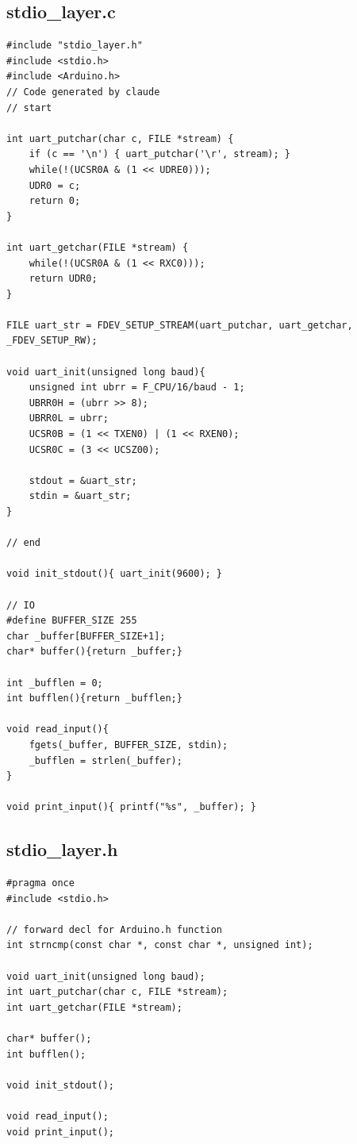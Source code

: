 \documentclass[12pt,a4paper]{article}
\begin{document}
\subsection{stdio\_layer.c}
\begin{lstlisting}
#include "stdio_layer.h"
#include <stdio.h>
#include <Arduino.h>
// Code generated by claude
// start

int uart_putchar(char c, FILE *stream) {
	if (c == '\n') { uart_putchar('\r', stream); }
	while(!(UCSR0A & (1 << UDRE0)));
	UDR0 = c;
	return 0;
}

int uart_getchar(FILE *stream) {
	while(!(UCSR0A & (1 << RXC0)));
	return UDR0;
}

FILE uart_str = FDEV_SETUP_STREAM(uart_putchar, uart_getchar, _FDEV_SETUP_RW);

void uart_init(unsigned long baud){
	unsigned int ubrr = F_CPU/16/baud - 1;
	UBRR0H = (ubrr >> 8);
	UBRR0L = ubrr;
	UCSR0B = (1 << TXEN0) | (1 << RXEN0);
	UCSR0C = (3 << UCSZ00);

	stdout = &uart_str;
	stdin = &uart_str;
}

// end

void init_stdout(){ uart_init(9600); }

// IO
#define BUFFER_SIZE 255
char _buffer[BUFFER_SIZE+1];
char* buffer(){return _buffer;}

int _bufflen = 0;
int bufflen(){return _bufflen;}

void read_input(){
	fgets(_buffer, BUFFER_SIZE, stdin);
	_bufflen = strlen(_buffer);
}

void print_input(){ printf("%s", _buffer); }
\end{lstlisting}

\subsection{stdio\_layer.h}
\begin{lstlisting}
#pragma once
#include <stdio.h>

// forward decl for Arduino.h function
int strncmp(const char *, const char *, unsigned int);

void uart_init(unsigned long baud);
int uart_putchar(char c, FILE *stream);
int uart_getchar(FILE *stream);

char* buffer();
int bufflen();

void init_stdout();

void read_input();
void print_input();
\end{lstlisting}
\end{document}
